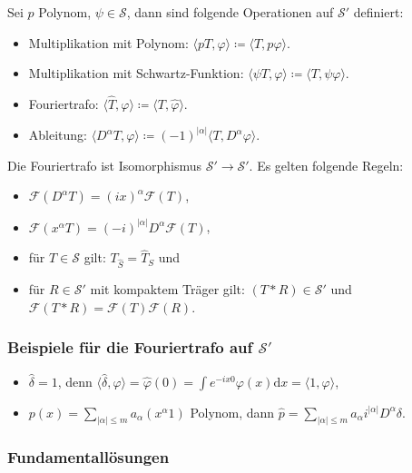 \documentclass[11pt,a4paper]{scrartcl}
\newcommand{\Sc}{\mathcal{S}}
\newcommand{\F}{\mathcal{F}}
\theoremstyle{plain}
\theoremstyle{definition}
\theoremstyle{remark}
\begin{document}
Sei $p$ Polynom, $\psi\in \Sc$, dann sind folgende Operationen auf $\Sc'$ definiert:

\begin{itemize}
    \item Multiplikation mit Polynom: $\langle pT, \varphi \rangle \coloneqq \langle T, p\varphi \rangle$.
    \item Multiplikation mit Schwartz-Funktion: $\langle \psi T, \varphi \rangle \coloneqq \langle T, \psi\varphi \rangle$.
    \item Fouriertrafo: $\langle \hat T, \varphi \rangle \coloneqq \langle T, \hat\varphi \rangle$.
    \item Ableitung: $\langle D^\alpha T, \varphi \rangle \coloneqq (-1)^{|\alpha|} \langle T, D^\alpha \varphi \rangle$.
\end{itemize}

Die Fouriertrafo ist Isomorphismus $\Sc'\to\Sc'$. Es gelten folgende Regeln:

\begin{itemize}
    \item $\F(D^\alpha T) = (ix)^\alpha \F(T)$,
    \item $\F(x^\alpha T) = (-i)^{|\alpha|} D^\alpha \F(T)$,
    \item für $T\in \Sc$ gilt: $T_{\hat S} = \widehat T_S$ und
    \item für $R\in \Sc'$ mit kompaktem Träger gilt: $(T*R)\in \Sc'$ und $\F(T*R)=\F(T)\F(R)$.
\end{itemize}

\subsubsection{Beispiele für die Fouriertrafo auf $\Sc'$}

\begin{itemize}
    \item $\hat\delta = 1$, denn $\langle \hat\delta, \varphi \rangle = \hat \varphi(0) = \int e^{-ix0} \varphi(x) \mathrm{d}x = \langle 1, \varphi \rangle$,
    \item $p(x)=\sum_{|\alpha| \leq m} a_\alpha (x^\alpha 1)$ Polynom, dann $\hat p = \sum_{|\alpha| \leq m} a_\alpha i^{|\alpha|} D^\alpha \delta$.
\end{itemize}

\subsubsection{Fundamentallösungen}
\end{document}
